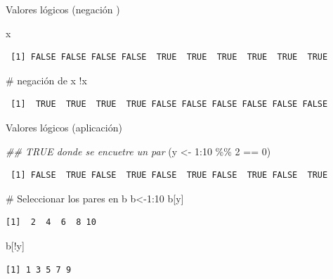 \documentclass[
  ignorenonframetext,
  aspectratio=169,
  spanish,
]{beamer}
\newenvironment{Shaded}{\begin{snugshade}}{\end{snugshade}}
\newcommand{\CommentTok}[1]{\textcolor[rgb]{0.37,0.37,0.37}{#1}}
\newcommand{\DecValTok}[1]{\textcolor[rgb]{0.68,0.00,0.00}{#1}}
\newcommand{\DocumentationTok}[1]{\textcolor[rgb]{0.37,0.37,0.37}{\textit{#1}}}
\newcommand{\NormalTok}[1]{\textcolor[rgb]{0.00,0.23,0.31}{#1}}
\newcommand{\OtherTok}[1]{\textcolor[rgb]{0.00,0.23,0.31}{#1}}
\newcommand{\SpecialCharTok}[1]{\textcolor[rgb]{0.37,0.37,0.37}{#1}}
\begin{document}
\begin{frame}[fragile]{Valores lógicos (negación )}
\label{valores-luxf3gicos-negaciuxf3n}
\begin{Shaded}
\begin{Highlighting}[]
\NormalTok{x}
\end{Highlighting}
\end{Shaded}

\begin{verbatim}
 [1] FALSE FALSE FALSE FALSE  TRUE  TRUE  TRUE  TRUE  TRUE  TRUE
\end{verbatim}

\begin{Shaded}
\begin{Highlighting}[]
\CommentTok{\# negación de x }
\SpecialCharTok{!}\NormalTok{x }
\end{Highlighting}
\end{Shaded}

\begin{verbatim}
 [1]  TRUE  TRUE  TRUE  TRUE FALSE FALSE FALSE FALSE FALSE FALSE
\end{verbatim}
\end{frame}

\begin{frame}[fragile]{Valores lógicos (aplicación)}
\label{valores-luxf3gicos-aplicaciuxf3n}
\begin{Shaded}
\begin{Highlighting}[]
\DocumentationTok{\#\# TRUE donde  se encuetre un par  }
\NormalTok{(y }\OtherTok{\textless{}{-}} \DecValTok{1}\SpecialCharTok{:}\DecValTok{10} \SpecialCharTok{\%\%} \DecValTok{2} \SpecialCharTok{==} \DecValTok{0}\NormalTok{) }
\end{Highlighting}
\end{Shaded}

\begin{verbatim}
 [1] FALSE  TRUE FALSE  TRUE FALSE  TRUE FALSE  TRUE FALSE  TRUE
\end{verbatim}

\begin{Shaded}
\begin{Highlighting}[]
\CommentTok{\# Seleccionar los pares en b  }
\NormalTok{b}\OtherTok{\textless{}{-}}\DecValTok{1}\SpecialCharTok{:}\DecValTok{10}
\NormalTok{b[y]}
\end{Highlighting}
\end{Shaded}

\begin{verbatim}
[1]  2  4  6  8 10
\end{verbatim}

\begin{Shaded}
\begin{Highlighting}[]
\NormalTok{b[}\SpecialCharTok{!}\NormalTok{y]}
\end{Highlighting}
\end{Shaded}

\begin{verbatim}
[1] 1 3 5 7 9
\end{verbatim}
\end{frame}
\end{document}
